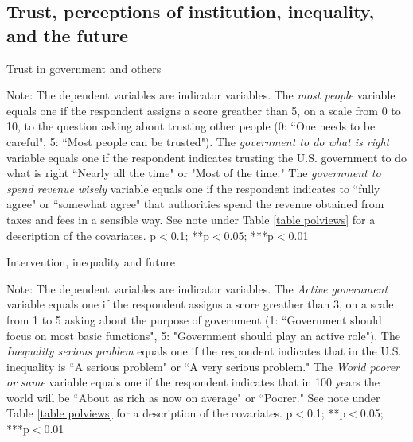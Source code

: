 \documentclass{article}
\begin{document}
\clearpage
\subsection{Trust, perceptions of institution, inequality, and the future}



\begin{table}[h!]
	\caption{Trust in government and others}
	\begin{center}
		\scalebox{0.7}{}
	\end{center}
	{\footnotesize Note: The dependent variables are indicator variables. The \textit{most people} variable equals one if the respondent assigns a score greather than 5, on a scale from 0 to 10, to the question asking about trusting other people (0: ``One needs to be careful", 5: ``Most people can be trusted"). The \textit{government to do what is right} variable equals one if the respondent indicates trusting the U.S. government to do what is right ``Nearly all the time" or "Most of the time." The \textit{government to spend revenue wisely} variable equals one if the respondent indicates to ``fully agree" or ``somewhat agree" that authorities spend the revenue obtained from taxes and fees in a sensible way.
	See note under Table \ref{table polviews} for a description of the covariates.
		\newline *p$<$0.1; **p$<$0.05; ***p$<$0.01}	
\end{table}	

\begin{table}[h!]
	\caption{Intervention, inequality and future}
	\begin{center}
		\scalebox{0.7}{}
	\end{center}
	{\footnotesize Note: The dependent variables are indicator variables. The \textit{Active government} variable equals one if the respondent assigns a score greather than 3, on a scale from 1 to 5 asking about the purpose of government (1: ``Government should focus on most basic functions", 5: "Government should play an active role"). The \textit{Inequality serious problem} equals one if the respondent indicates that in the U.S. inequality is ``A serious problem" or ``A very serious problem." The \textit{World poorer or same} variable equals one if the respondent indicates that in 100 years the world will be ``About as rich as now on average" or ``Poorer."
	See note under Table \ref{table polviews} for a description of the covariates.
	\newline *p$<$0.1; **p$<$0.05; ***p$<$0.01}
\end{table}	
\end{document}
